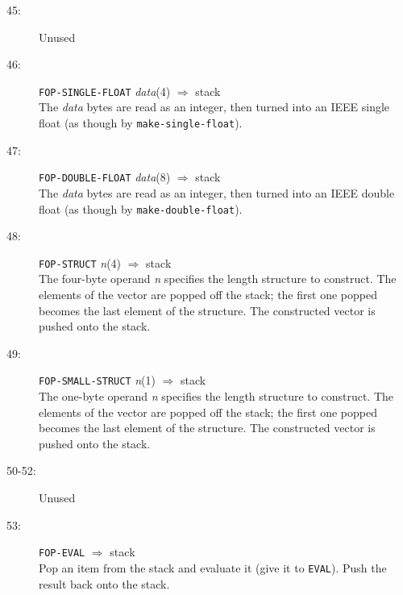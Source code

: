 \begin{description}
\item[45:] Unused

\item[46:] \hspace{2em} {\tt FOP-SINGLE-FLOAT} \hspace{2em} {\it data}(4) \hspace{2em}
$\Rightarrow$ \hspace{2em} stack \\
The {\it data} bytes are read as an integer, then turned into an IEEE single
float (as though by {\tt make-single-float}).

\item[47:] \hspace{2em} {\tt FOP-DOUBLE-FLOAT} \hspace{2em} {\it data}(8) \hspace{2em}
$\Rightarrow$ \hspace{2em} stack \\
The {\it data} bytes are read as an integer, then turned into an IEEE double
float (as though by {\tt make-double-float}).

\item[48:] \hspace{2em} {\tt FOP-STRUCT} \hspace{2em} {\it n}(4) \hspace{2em} $\Rightarrow$ \hspace{2em} stack \\
The four-byte operand {\it n} specifies the length structure to construct.  The
elements of the vector are popped off the stack; the first one popped becomes
the last element of the structure.  The constructed vector is pushed onto the
stack.

\item[49:] \hspace{2em} {\tt FOP-SMALL-STRUCT} \hspace{2em} {\it n}(1) \hspace{2em} $\Rightarrow$ \hspace{2em} stack \\
The one-byte operand {\it n} specifies the length structure to construct.  The
elements of the vector are popped off the stack; the first one popped becomes
the last element of the structure.  The constructed vector is pushed onto the
stack.

\item[50-52:] Unused

\item[53:] \hspace{2em} {\tt FOP-EVAL} \hspace{2em} $\Rightarrow$ \hspace{2em} stack \\
Pop an item from the stack and evaluate it (give it to {\tt EVAL}).
Push the result back onto the stack.


\end{description}
